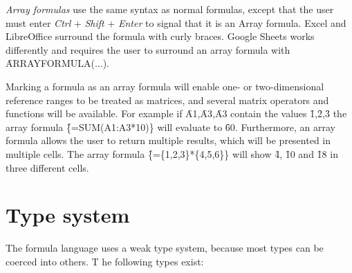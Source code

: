 \emph{Array formulas} use the same syntax as normal formulas, except that the user must enter \emph{Ctrl} + \emph{Shift} + \emph{Enter} to signal that it is an Array formula.
Excel and LibreOffice surround the formula with curly braces.
Google Sheets works differently and requires the user to surround an array formula with \f{ARRAYFORMULA($\ldots$)}.

Marking a formula as an array formula will enable one- or two-dimensional reference ranges to be treated as matrices, and several matrix operators and functions will be available. 
For example if \f{A1},\f{A3},\f{A3} contain the values \f{1},\f{2},\f{3} the array formula \f{\{=SUM(A1:A3*10)\}} will evaluate to \f{60}.
Furthermore, an array formula allows the user to return multiple results, which will be presented in multiple cells.
The array formula \f{\{=\{1,2,3\}*\{4,5,6\}\}} will show \f{4}, \f{10} and \f{18} in three different cells.

\newpage

\section{Type system}

The formula language uses a weak type system, because most types can be coerced into others.
T he following types exist:

